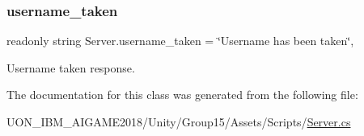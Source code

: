 \subsubsection{\texorpdfstring{username\_taken}{username\_taken}}
{\footnotesize\ttfamily readonly string Server.\+username\+\_\+taken = \char`\"{}Username has been taken\char`\"{}\hspace{0.3cm}{\ttfamily [static]}, {\ttfamily [private]}}



Username taken response. 



The documentation for this class was generated from the following file\+:\begin{DoxyCompactItemize}
\item 
U\+O\+N\+\_\+\+I\+B\+M\+\_\+\+A\+I\+G\+A\+M\+E2018/\+Unity/\+Group15/\+Assets/\+Scripts/\mbox{\hyperlink{_server_8cs}{Server.\+cs}}\end{DoxyCompactItemize}
